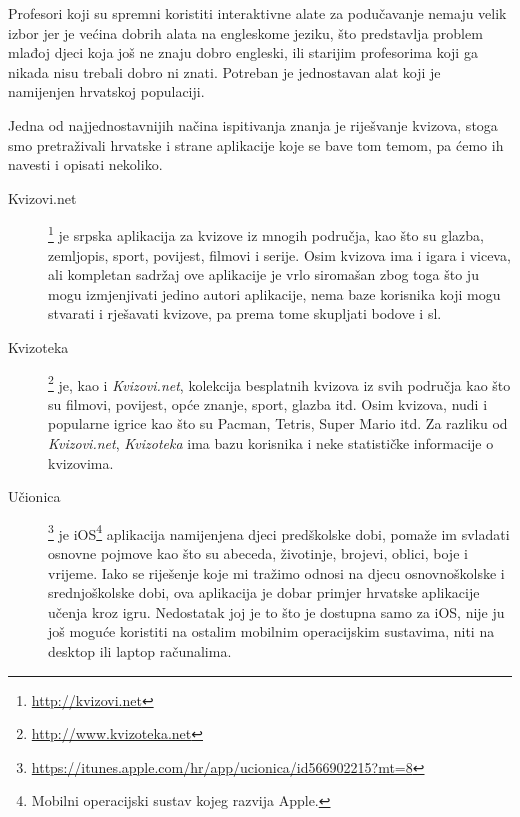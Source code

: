 \documentclass{scrreprt}
\begin{document}
Profesori koji su spremni koristiti interaktivne alate za podučavanje nemaju velik
izbor jer je većina dobrih alata na engleskome jeziku, što predstavlja problem
mlađoj djeci koja još ne znaju dobro engleski, ili starijim profesorima koji ga
nikada nisu trebali dobro ni znati. Potreban je jednostavan alat koji je
namijenjen hrvatskoj populaciji.

Jedna od najjednostavnijih načina ispitivanja znanja je riješvanje kvizova,
stoga smo pretraživali hrvatske i strane aplikacije koje se bave tom temom, pa
ćemo ih navesti i opisati nekoliko.

\begin{description}

  \item[Kvizovi.net]\footnote{\url{http://kvizovi.net}} je srpska aplikacija za
    kvizove iz mnogih područja, kao što su glazba, zemljopis, sport, povijest,
    filmovi i serije. Osim kvizova ima i igara i viceva, ali kompletan sadržaj
    ove aplikacije je vrlo siromašan zbog toga što ju mogu izmjenjivati jedino
    autori aplikacije, nema baze korisnika koji mogu stvarati i rješavati
    kvizove, pa prema tome skupljati bodove i sl.

  \item[Kvizoteka]\footnote{\url{http://www.kvizoteka.net}} je, kao i
    \emph{Kvizovi.net}, kolekcija besplatnih kvizova iz svih područja kao što su
    filmovi, povijest, opće znanje, sport, glazba itd. Osim kvizova, nudi i
    popularne igrice kao što su Pacman, Tetris, Super Mario itd. Za razliku od
    \emph{Kvizovi.net}, \emph{Kvizoteka} ima bazu korisnika i neke statističke
    informacije o kvizovima.

  \item[Učionica]\footnote{\url{https://itunes.apple.com/hr/app/ucionica/id566902215?mt=8}}
    je iOS\footnote{Mobilni operacijski sustav kojeg razvija Apple.} aplikacija
    namijenjena djeci predškolske dobi, pomaže im svladati osnovne pojmove kao
    što su abeceda, životinje, brojevi, oblici, boje i vrijeme. Iako se
    riješenje koje mi tražimo odnosi na djecu osnovnoškolske i srednjoškolske
    dobi, ova aplikacija je dobar primjer hrvatske aplikacije učenja kroz igru.
    Nedostatak joj je to što je dostupna samo za iOS, nije ju još moguće
    koristiti na ostalim mobilnim operacijskim sustavima, niti na desktop ili
    laptop računalima.


\end{description}
\end{document}
